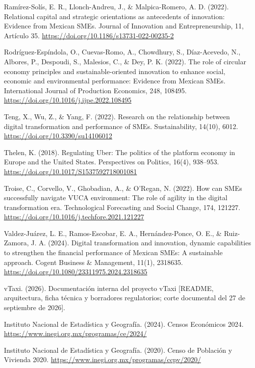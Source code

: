 {Ramírez-Solís, E. R., Llonch-Andreu, J., \& Malpica-Romero, A. D. (2022). Relational capital and strategic orientations as antecedents of innovation: Evidence from Mexican SMEs. Journal of Innovation and Entrepreneurship, 11, Artículo 35. \url{https://doi.org/10.1186/s13731-022-00235-2}


Rodríguez-Espíndola, O., Cuevas-Romo, A., Chowdhury, S., Díaz-Acevedo, N., Albores, P., Despoudi, S., Malesios, C., \& Dey, P. K. (2022). The role of circular economy principles and sustainable-oriented innovation to enhance social, economic and environmental performance: Evidence from Mexican SMEs. International Journal of Production Economics, 248, 108495. \url{https://doi.org/10.1016/j.ijpe.2022.108495}


Teng, X., Wu, Z., \& Yang, F. (2022). Research on the relationship between digital transformation and performance of SMEs. Sustainability, 14(10), 6012. \url{https://doi.org/10.3390/su14106012}


Thelen, K. (2018). Regulating Uber: The politics of the platform economy in Europe and the United States. Perspectives on Politics, 16(4), 938–953. \url{https://doi.org/10.1017/S1537592718001081}


Troise, C., Corvello, V., Ghobadian, A., \& O'Regan, N. (2022). How can SMEs successfully navigate VUCA environment: The role of agility in the digital transformation era. Technological Forecasting and Social Change, 174, 121227. \url{https://doi.org/10.1016/j.techfore.2021.121227}


Valdez-Juárez, L. E., Ramos-Escobar, E. A., Hernández-Ponce, O. E., \& Ruiz-Zamora, J. A. (2024). Digital transformation and innovation, dynamic capabilities to strengthen the financial performance of Mexican SMEs: A sustainable approach. Cogent Business \& Management, 11(1), 2318635. \url{https://doi.org/10.1080/23311975.2024.2318635}


vTaxi. (2026). Documentación interna del proyecto vTaxi [README, arquitectura, ficha técnica y borradores regulatorios; corte documental del 27 de septiembre de 2026].


Instituto Nacional de Estadística y Geografía. (2024). Censos Económicos 2024. \url{https://www.inegi.org.mx/programas/ce/2024/}


Instituto Nacional de Estadística y Geografía. (2020). Censo de Población y Vivienda 2020. \url{https://www.inegi.org.mx/programas/ccpv/2020/}


\clearpage
\pagestyle{empty}
\begin{landscape}

\end{landscape}}
